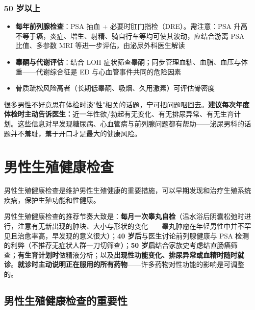 \documentclass[12pt,a4paper,twoside]{ctexbook}
\begin{document}
\subsubsection{50 岁以上}

\begin{itemize}
	\item \textbf{每年前列腺检查}：PSA 抽血 + 必要时肛门指检（DRE）。需注意：PSA 升高不等于癌，炎症、增生、射精、骑自行车等均可使其波动，应结合游离 PSA 比值、多参数 MRI 等进一步评估，由泌尿外科医生解读
	\item \textbf{睾酮与代谢评估}：结合 LOH 症状筛查睾酮；同步管理血糖、血脂、血压与体重——代谢综合征是 ED 与心血管事件共同的危险因素
	\item 骨质疏松风险高者（长期低睾酮、吸烟、久用激素）可评估骨密度
\end{itemize}

\begin{tcolorbox}[colback=pink!5!white,colframe=red!50!black,title=贴心小叮咛]
很多男性不好意思在体检时谈"性"相关的话题，宁可把问题咽回去。\textbf{建议每次年度体检时主动告诉医生：}近一年性欲/勃起有无变化、有无排尿异常、有无生育计划。这些信息对早发现糖尿病、心血管病与前列腺问题都有帮助——泌尿男科的话题并不羞耻，羞于开口才是最大的健康风险。
\end{tcolorbox}


\section{男性生殖健康检查}

男性生殖健康检查是维护男性生殖健康的重要措施，可以早期发现和治疗生殖系统疾病，保护生殖功能和性健康。


男性生殖健康检查的推荐节奏大致是：\textbf{每月一次睾丸自检}（温水浴后阴囊松弛时进行，注意有无新出现的肿块、大小与形状的变化——睾丸肿瘤在年轻男性中并不罕见且治愈率高，早发现的意义很大）；\textbf{40 岁后}与医生讨论前列腺健康与 PSA 检测的利弊（不推荐无症状人群一刀切筛查）；\textbf{50 岁后}结合家族史考虑结直肠癌筛查；\textbf{有生育计划时}做精液分析；以及\textbf{出现性功能变化、排尿异常或血精时随时就诊}。\textbf{就诊时主动说明正在服用的所有药物}——许多药物对性功能的影响是可调整的。

\subsection{男性生殖健康检查的重要性}
\end{document}
